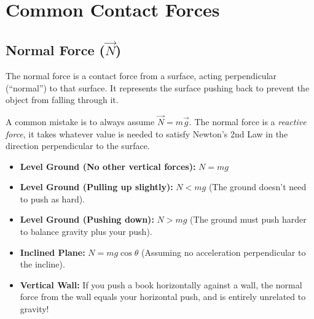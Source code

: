 \documentclass{article}
\begin{document}
\newpage

\section{Common Contact Forces}

\subsection{Normal Force ($\vec{N}$)}
The normal force is a contact force from a surface, acting perpendicular (``normal'') to that surface. It represents the surface pushing back to prevent the object from falling through it. 

A common mistake is to always assume $\vec{N} = m\vec{g}$. The normal force is a \emph{reactive force}, it takes whatever value is needed to satisfy Newton's 2nd Law in the direction perpendicular to the surface.
\begin{itemize}
    \item \textbf{Level Ground (No other vertical forces):} $N = mg$
    \item \textbf{Level Ground (Pulling up slightly):} $N < mg$ (The ground doesn't need to push as hard).
    \item \textbf{Level Ground (Pushing down):} $N > mg$ (The ground must push harder to balance gravity plus your push).
    \item \textbf{Inclined Plane:} $N = mg\cos\theta$ (Assuming no acceleration perpendicular to the incline).
    \item \textbf{Vertical Wall:} If you push a book horizontally against a wall, the normal force from the wall equals your horizontal push, and is entirely unrelated to gravity!
\end{itemize}
\end{document}
